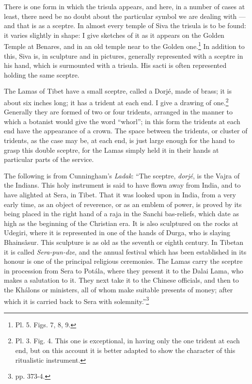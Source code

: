 \documentclass[a4paper, 11pt, oneside, english, landscape, twocolumn]{article}
\begin{document}
There is one form in which the trisula appears, and here, in a number of cases at least, there need be no doubt about the particular symbol we are dealing with --- and that is as a sceptre. In almost every temple of Siva the trisula is to be found: it varies slightly in shape: I give sketches of it as it appears on the Golden Temple at Benares, and in an old temple near to the Golden one.\footnote{Pl. 5. Figs. 7, 8, 9.} In addition to this, Siva is, in sculpture and in pictures, generally represented with a sceptre in his hand, which is surmounted with a trisula. His sacti is often represented holding the same sceptre.

The Lamas of Tibet have a small sceptre, called a Dorjé, made of brass; it is about six inches long; it has a trident at each end. I give a drawing of one.\footnote{Pl. 3. Fig. 4. This one is exceptional, in having only the one trident at each end, but on this account it is better adapted to show the character of this ritualistic instrument.} Generally they are formed of two or four tridents, arranged in the manner to which a botanist would give the word ``whorl''; in this form the tridents at each end have the appearance of a crown. The space between the tridents, or cluster of tridents, as the case may be, at each end, is just large enough for the hand to grasp this double sceptre, for the Lamas simply held it in their hands at particular parts of the service.

The following is from Cunningham's \emph{Ladak}: ``The sceptre, \emph{dorjé}, is the Vajra of the Indians. This holy instrument is said to have flown away from India, and to have alighted at Sera, in Tibet. That it was looked upon in India, from a very early time, as an object of reverence, or as an emblem of power, is proved by its being placed in the right hand of a raja in the Sanchi bas-reliefs, which date as high as the beginning of the Christian era. It is also sculptured on the rocks at Udegiri, where it is represented in one of the hands of Durga, who is slaying Bhainsâsur. This sculpture is as old as the seventh or eighth century. In Tibetan it is called \emph{Sera-pun-dze}, and the annual festival which has been established in its honour is one of the principal religious ceremonies. The Lamas carry the sceptre in procession from Sera to Potála, where they present it to the Dalai Lama, who makes a salutation to it. They next take it to the Chinese officials, and then to the Khálons or ministers, all of whom make suitable presents of money; after which it is carried back to Sera with solemnity.''\footnote{pp. 373-4.}
\end{document}
